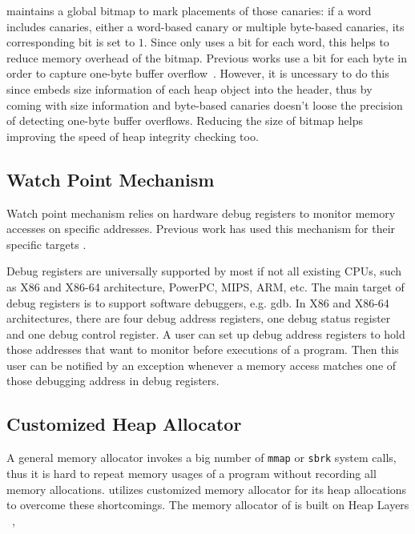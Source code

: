 \stopgap{} maintains a global bitmap to mark placements of those canaries:
if a word includes canaries, either a word-based canary or multiple
byte-based canaries, its corresponding bit is set to $1$.
Since \stopgap{} only uses a bit for each word, this helps to reduce memory overhead of the bitmap.
Previous works use a bit for each byte in order to capture one-byte buffer overflow~\cite{overflow:lbc, AddressSanitizer}.
However, it is uncessary to do this since \stopgap{} embeds size information of each heap object
into the header, thus by coming with size information and byte-based canaries \stopgap{} doesn't
loose the precision of detecting one-byte buffer overflows.
Reducing the size of bitmap helps improving the speed of heap integrity checking too.

\subsection{Watch Point Mechanism}
\label{sec:watchpoints}
Watch point mechanism relies on hardware debug registers to monitor memory accesses on
specific addresses. Previous work has used this mechanism for their specific 
targets \cite{fastboundschecking, Kivati}.

Debug registers are universally supported by most if not all existing CPUs, such as
X86 and X86-64 architecture, PowerPC, MIPS, ARM, etc. 
The main target of debug registers is to support software debuggers, e.g. gdb. 
In X86 and X86-64 architectures, there are four debug address registers, one debug 
status register and one debug control register. 
A user can set up debug address registers to hold those addresses that want to monitor 
before executions of a program. 
Then this user can be notified by an exception whenever a memory access matches one of those 
debugging address in debug registers. 


\subsection{Customized Heap Allocator}
\label{sec:allocator}
A general memory allocator invokes a big number of \texttt{mmap} or \texttt{sbrk} system calls,
thus it is hard to repeat memory usages of a program without recording all memory allocations. 
\DoubleTake{} utilizes customized memory allocator for its heap allocations to overcome these shortcomings. The memory allocator of \DoubleTake{} is built on Heap Layers ~\cite{heaplayers}, 


